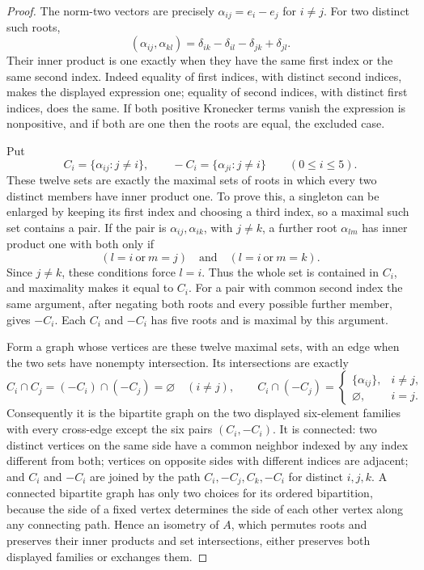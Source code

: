 \begin{proof}
The norm-two vectors are precisely
\(\alpha_{ij}=e_i-e_j\) for \(i\ne j\).  For two distinct such roots,
\[
 (\alpha_{ij},\alpha_{kl})
       =\delta_{ik}-\delta_{il}-\delta_{jk}+\delta_{jl}.
\]
Their inner product is one exactly when they have the same first index
or the same second index.  Indeed equality of first indices, with
distinct second indices, makes the displayed expression one; equality
of second indices, with distinct first indices, does the same.  If both
positive Kronecker terms vanish the expression is nonpositive, and if
both are one then the roots are equal, the excluded case.

Put
\[
 C_i=\{\alpha_{ij}:j\ne i\},\qquad
 -C_i=\{\alpha_{ji}:j\ne i\}\qquad(0\le i\le5).
\]
These twelve sets are exactly the maximal sets of roots in which every
two distinct members have inner product one.  To prove this, a singleton
can be enlarged by keeping its first index and choosing a third index,
so a maximal such set contains a pair.  If the pair is
\(\alpha_{ij},\alpha_{ik}\), with \(j\ne k\), a further root
\(\alpha_{lm}\) has inner product one with both only if
\[
 (l=i\ \text{or}\ m=j)\quad\text{and}\quad
 (l=i\ \text{or}\ m=k).
\]
Since \(j\ne k\), these conditions force \(l=i\).  Thus the whole
set is contained in \(C_i\), and maximality makes it equal to \(C_i\).
For a pair with common second index the same argument, after negating
both roots and every possible further member, gives \(-C_i\).
Each \(C_i\) and \(-C_i\) has five roots and is maximal by this argument.

Form a graph whose vertices are these twelve maximal sets, with an edge
when the two sets have nonempty intersection.  Its intersections are
exactly
\[
 C_i\cap C_j=(-C_i)\cap(-C_j)=\varnothing\quad(i\ne j),
 \qquad
 C_i\cap(-C_j)=
 \begin{cases}\{\alpha_{ij}\},&i\ne j,\\
               \varnothing,&i=j.
 \end{cases}
\]
Consequently it is the bipartite graph on the two displayed six-element
families with every cross-edge except the six pairs \((C_i,-C_i)\).
It is connected: two distinct vertices on the same side have a common
neighbor indexed by any index different from both; vertices on opposite
sides with different indices are adjacent; and \(C_i\) and \(-C_i\)
are joined by the path
\(C_i,-C_j,C_k,-C_i\) for distinct \(i,j,k\).
A connected bipartite graph has only two choices for its ordered
bipartition, because the side of a fixed vertex determines the side of
each other vertex along any connecting path.  Hence an isometry of
\(A\), which permutes roots and preserves their inner products and set
intersections, either preserves both displayed families or exchanges them.


\end{proof}
